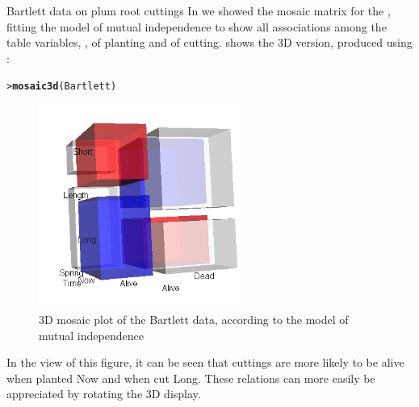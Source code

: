 \documentclass[10pt,krantz2]{krantz}\usepackage[]{graphicx}\usepackage[]{color}
\makeatletter
\newcommand{\hlstd}[1]{\textcolor[rgb]{0.345,0.345,0.345}{#1}}%
\newcommand{\hlkwd}[1]{\textcolor[rgb]{0.737,0.353,0.396}{\textbf{#1}}}%
\newenvironment{kframe}{%
 \def\at@end@of@kframe{}%
 \ifinner\ifhmode%
  \def\at@end@of@kframe{\end{minipage}}%
  \begin{minipage}{\columnwidth}%
 \fi\fi%
 \def\FrameCommand##1{\hskip\@totalleftmargin \hskip-\fboxsep
 \colorbox{shadecolor}{##1}\hskip-\fboxsep
     \hskip-\linewidth \hskip-\@totalleftmargin \hskip\columnwidth}%
 \MakeFramed {\advance\hsize-\width
   \@totalleftmargin\z@ \linewidth\hsize
   \@setminipage}}%
 {\par\unskip\endMakeFramed%
 \at@end@of@kframe}
\newenvironment{knitrout}{}{} %
\renewenvironment{knitrout}{\small\renewcommand{\baselinestretch}{.85}}{} %
\makeatother
\begin{document}
\begin{Example}[bartlett-3d]{Bartlett data on plum root cuttings}
In  we showed the mosaic matrix for the
, fitting the model of mutual independence
to show all associations among the table variables,
,  of planting and  of cutting.
 shows the 3D version, produced using
:
\begin{knitrout}
\color{fgcolor}\begin{kframe}
\begin{alltt}
\hlstd{> }\hlkwd{mosaic3d}\hlstd{(Bartlett)}
\end{alltt}
\end{kframe}
\end{knitrout}

\begin{figure}[!htb]
 \centering
 \includegraphics[width=0.6\textwidth]{ch05/fig/mos3d-bartlett.png}
 \caption{3D mosaic plot of the Bartlett data, according to the model of mutual independence}\label{fig:mos3d-bartlett}
\end{figure}

In the view of this figure, it can be seen that cuttings are more likely to be alive
when planted Now and when cut Long. These relations can more easily be
appreciated by rotating the 3D display.
\end{Example}

\end{document}
